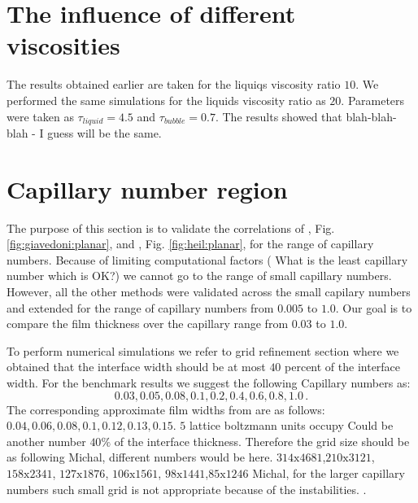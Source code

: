 \documentclass{article}
\begin{document}
\section{The influence of different viscosities}
The results obtained earlier are taken for the liquiqs viscosity ratio $10$.
We performed the same simulations for the liquids viscosity ratio as $20$.
Parameters were taken as $\tau_{liquid}=4.5$ and $\tau_{bubble}=0.7$. 
{\color{red} The results showed that blah-blah-blah - I guess will be the same}.

\section{Capillary number region}
The purpose of this section is to validate the correlations of
\citet{giavedoni-numerical}, Fig. \ref{fig:giavedoni:planar}, and
\citet{heil-bretherton}, Fig. \ref{fig:heil:planar}, for the range of capillary
numbers. Because of limiting computational factors ({\color{red} What is the
least capillary number which is OK?}) we cannot go to the range of small
capillary numbers. However, all the other methods were validated across the
small capilary numbers and extended for the range of capillary numbers from
$0.005$ to $1.0$. Our goal is to compare the film thickness over the capillary
range from $0.03$ to $1.0$. 

To perform numerical simulations we refer to
grid refinement section where we obtained that the interface width should be
at most {\color{red} $40$} percent of the interface width. For the benchmark
results we
suggest the following Capillary numbers as:
\begin{equation}
0.03,0.05,0.08,0.1,0.2,0.4,0.6,0.8,1.0\, .
\end{equation}
The corresponding approximate film widths from \cite{giavedoni-numerical} are as
follows:
$0.04,0.06,0.08,0.1,0.12,0.13,0.15$. $5$ lattice boltzmann units occupy
{\color{red} Could be another number $40\%$} of the interface thickness.
Therefore the grid size should be as
following {\color{red} Michal, different numbers would be here.
$314\mathrm{x}4681$,$210\mathrm{x}3121$,
$158\mathrm{x}2341$, $127\mathrm{x}1876$, $106\mathrm{x}1561$,
$98\mathrm{x}1441$,$85\mathrm{x}1246$ Michal, for the larger capillary
numbers such small grid is not
appropriate because of the instabilities.
}.
\end{document}
